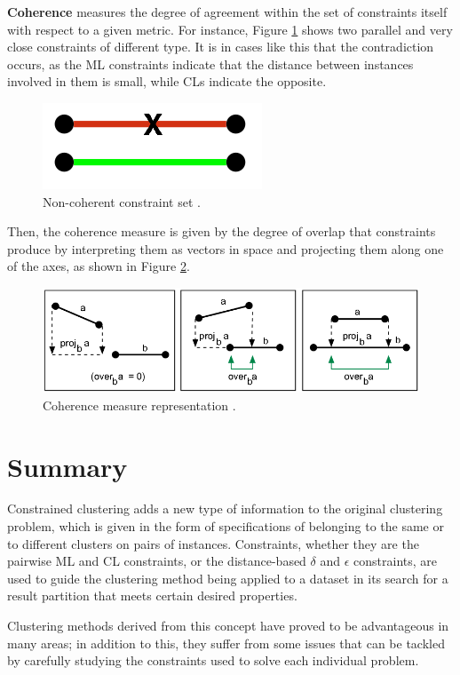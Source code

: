 \textbf{Coherence} measures the degree of agreement within the set of constraints itself with respect to a given metric. For instance, Figure \ref{fig:Coherence} shows two parallel and very close constraints of different type. It is in cases like this that the contradiction occurs, as the \acs{ML} constraints indicate that the distance between instances involved in them is small, while \acsp{CL} indicate the opposite.

\begin{figure}[!h]
	\centering
	\includegraphics[scale=0.4]{gfx/ConstClust/Coherencia/Coher1}
	\caption[Non-coherent constraint set.]{Non-coherent constraint set \cite{davidson2007survey}.}\label{fig:Coherence}
\end{figure}

Then, the coherence measure is given by the degree of overlap that constraints produce by interpreting them as vectors in space and projecting them along one of the axes, as shown in Figure \ref{fig:CoherenceOverlap}.

\begin{figure}[!h]
	\centering
	\includegraphics[scale=0.4]{gfx/ConstClust/Coherencia/Coher2}
	\caption[Coherence measure representation.]{Coherence measure representation \cite{davidson2007survey}.}\label{fig:CoherenceOverlap}
\end{figure}

\section{Summary}

Constrained clustering adds a new type of information to the original clustering problem, which is given in the form of specifications of belonging to the same or to different clusters on pairs of instances. Constraints, whether they are the pairwise \acf{ML} and \acf{CL} constraints, or the distance-based $\delta$ and $\epsilon$ constraints, are used to guide the clustering method being applied to a dataset in its search for a result partition that meets certain desired properties.

Clustering methods derived from this concept have proved to be advantageous in many areas; in addition to this, they suffer from some issues that can be tackled by carefully studying the constraints used to solve each individual problem.
